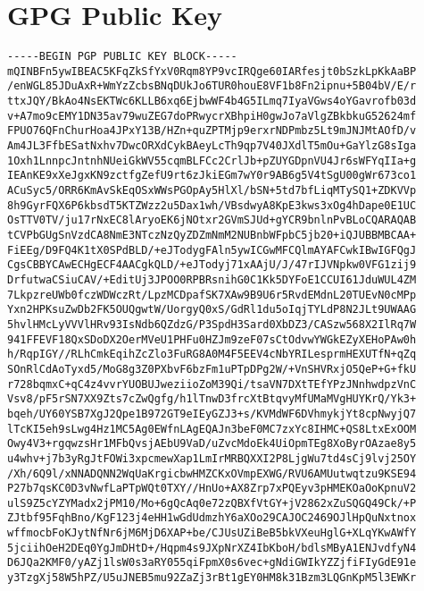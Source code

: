 \section{GPG Public Key}
\label{gpg}

\scriptsize\begin{verbatim}
-----BEGIN PGP PUBLIC KEY BLOCK-----
mQINBFn5ywIBEAC5KFqZkSfYxV0Rqm8YP9vcIRQge60IARfesjt0bSzkLpKkAaBP
/enWGL85JDuAxR+WmYzZcbsBNqDUkJo6TUR0houE8VF1b8Fn2ipnu+5B04bV/E/r
ttxJQY/BkAo4NsEKTWc6KLLB6xq6EjbwWF4b4G5ILmq7IyaVGws4oYGavrofb03d
v+A7mo9cEMY1DN35av79wuZEG7doPRwycrXBhpiH0gwJo7aVlgZBkbkuG52624mf
FPUO76QFnChurHoa4JPxY13B/HZn+quZPTMjp9erxrNDPmbz5Lt9mJNJMtAOfD/v
Am4JL3FfbESatNxhv7DwcORXdCykBAeyLcTh9qp7V40JXdlT5mOu+GaYlzG8sIga
1Oxh1LnnpcJntnhNUeiGkWV55cqmBLFCc2CrlJb+pZUYGDpnVU4Jr6sWFYqIIa+g
IEAnKE9xXeJgxKN9zctfgZefU9rt6zJkiEGm7wY0r9AB6g5V4tSgU00gWr673co1
ACuSyc5/ORR6KmAvSkEqOSxWWsPGOpAy5HlXl/bSN+5td7bfLiqMTySQ1+ZDKVVp
8h9GyrFQX6P6kbsdT5KTZWzz2u5Dax1wh/VBsdwyA8KpE3kws3xOg4hDape0E1UC
OsTTV0TV/ju17rNxEC8lAryoEK6jNOtxr2GVmSJUd+gYCR9bnlnPvBLoCQARAQAB
tCVPbGUgSnVzdCA8NmE3NTczNzQyZDZmNmM2NUBnbWFpbC5jb20+iQJUBBMBCAA+
FiEEg/D9FQ4K1tX0SPdBLD/+eJTodygFAln5ywICGwMFCQlmAYAFCwkIBwIGFQgJ
CgsCBBYCAwECHgECF4AACgkQLD/+eJTodyj71xAAjU/J/47rIJVNpkw0VFG1zij9
DrfutwaCSiuCAV/+EditUj3JPOO0RPBRsnihG0C1Kk5DYFoE1CCUI61JduWUL4ZM
7LkpzreUWb0fczWDWczRt/LpzMCDpafSK7XAw9B9U6r5RvdEMdnL20TUEvN0cMPp
Yxn2HPKsuZwDb2FK5OUQgwtW/UorgyQ0xS/GdRl1du5oIqjTYLdP8N2JLt9UWAAG
5hvlHMcLyVVVlHRv93IsNdb6QZdzG/P3SpdH3Sard0XbDZ3/CASzw568X2IlRq7W
941FFEVF18QxSDoDX2OerMVeU1PHFu0HZJm9zeF07sCtOdvwYWGkEZyXEHoPAw0h
h/RqpIGY//RLhCmkEqihZcZlo3FuRG8A0M4F5EEV4cNbYRILesprmHEXUTfN+qZq
SOnRlCdAoTyxd5/MoG8g3Z0PXbvF6bzFm1uPTpDPg2W/+VnSHVRxjO5QeP+G+fkU
r728bqmxC+qC4z4vvrYUOBUJweziioZoM39Qi/tsaVN7DXtTEfYPzJNnhwdpzVnC
Vsv8/pF5rSN7XX9Zts7cZwQgfg/h1lTnwD3frcXtBtqvyMfUMaMVgHUYKrQ/Yk3+
bqeh/UY60YSB7XgJ2Qpe1B972GT9eIEyGZJ3+s/KVMdWF6DVhmykjYt8cpNwyjQ7
lTcKI5eh9sLwg4Hz1MC5Ag0EWfnLAgEQAJn3beF0MC7zxYc8IHMC+QS8LtxExOOM
Owy4V3+rgqwzsHr1MFbQvsjAEbU9VaD/uZvcMdoEk4UiOpmTEg8XoByrOAzae8y5
u4whv+j7b3yRgJtFOWi3xpcmewXap1LmIrMRBQXXI2P8LjgWu7td4sCj9lvj25OY
/Xh/6Q9l/xNNADQNN2WqUaKrgicbwHMZCKxOVmpEXWG/RVU6AMUutwqtzu9KSE94
P27b7qsKC0D3vNwfLaPTpWQt0TXY//HnUo+AX8Zrp7xPQEyv3pHMEKOaOoKpnuV2
ulS9Z5cYZYMadx2jPM10/Mo+6gQcAq0e72zQBXfVtGY+jV2862xZuSQGQ49Ck/+P
ZJtbf95FqhBno/KgF123j4eHH1wGdUdmzhY6aXOo29CAJOC2469OJlHpQuNxtnox
wffmocbFoKJytNfNr6jM6MjD6XAP+be/CJUsUZiBeB5bkVXeuHglG+XLqYKwAWfY
5jciihOeH2DEq0YgJmDHtD+/Hqpm4s9JXpNrXZ4IbKboH/bdlsMByA1ENJvdfyN4
D6JQa2KMF0/yAZj1lsW0s3aRY055qiFpmX0s6vec+gNdiGWIkYZZjfiFIyGdE91e
y3TzgXj58W5hPZ/U5uJNEB5mu92ZaZj3rBt1gEY0HM8k31Bzm3LQGnKpM5l3EWKr

\end{verbatim}
